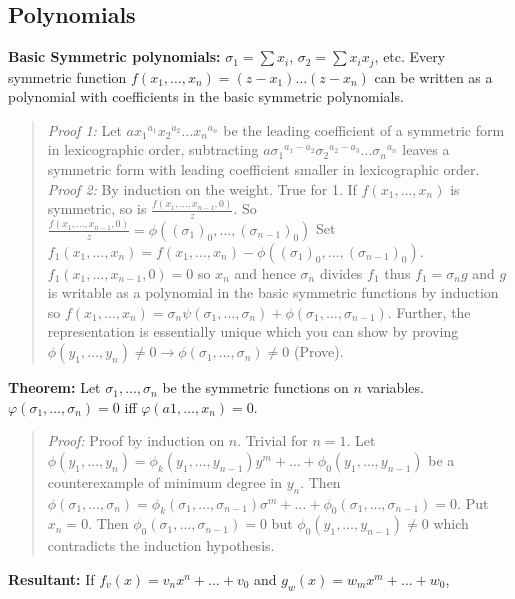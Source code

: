 \subsection{Polynomials}
{\bf Basic Symmetric polynomials:} $\sigma_1= \sum x_i$, $\sigma_2 = \sum x_i x_j$,
etc.  
Every symmetric function $f(x_1, \ldots , x_n)= (z-x_1) \ldots (z-x_n)$
can be written as a polynomial
with coefficients in the basic symmetric polynomials.  
\begin{quote}
\emph{Proof 1:}
Let $ a {x_1}^{a_1} {x_2}^{a_2} \ldots {x_n}^{a_n}$
be the leading coefficient of a symmetric form in lexicographic order,
subtracting
$a {\sigma_1}^{a_1 - a_2} {\sigma_2}^{a_2 - a_3} \ldots {\sigma_n}^{a_n}$
leaves a symmetric form with leading coefficient smaller in lexicographic
order.
\\
\emph{Proof 2:}  By induction on the weight.  True for 1.  If 
$f(x_1 , \ldots, x_n)$ is symmetric, so is
${\frac {f(x_1 , \ldots, x_{n-1},0)} z}$. 
So ${\frac {f(x_1 , \ldots, x_{n-1},0)} z}= 
\phi((\sigma_1)_0, \ldots , (\sigma_{n-1})_0)$
Set  
$f_1(x_1 , \ldots, x_n)=
f(x_1 , \ldots, x_n)-
\phi((\sigma_1)_0, \ldots , (\sigma_{n-1})_0)$.
$f_1(x_1 , \ldots, x_{n-1},0)=0$ so $x_n$ and hence $\sigma_n$ divides
$f_1$ thus $f_1 = \sigma_n g$ and $g$ is writable as a polynomial in the basic
symmetric functions by induction so
$f(x_1 , \ldots, x_n)= \sigma_n \psi(\sigma_1, \ldots , \sigma_n) 
+ \phi (\sigma_1 , \ldots , \sigma_{n-1})$.  Further, the representation is essentially
unique which you can show by proving 
$\phi(y_1 , \ldots , y_n) \ne 0 \rightarrow \phi(\sigma_1 , \ldots , \sigma_n) \ne 0 $
(Prove).
\end{quote}
{\bf Theorem:} Let $\sigma_1, \ldots , \sigma_n$ be the symmetric functions on $n$ variables.
$\varphi(\sigma_1 , \ldots , \sigma_n )=0 $ iff
$\varphi(a1 , \ldots , x_n )=0 $.
\begin{quote}
\emph{Proof:} 
Proof by induction on $n$.  Trivial for $n=1$.  
Let $\phi(y_1, \ldots , y_n)=
\phi_k(y_1, \ldots , y_{n-1}) y^m + \ldots + \phi_0(y_1 , \ldots , y_{n-1})$ be a
counterexample of minimum degree in $y_n$.
Then $\phi(\sigma_1, \ldots , \sigma_n)=
\phi_k(\sigma_1, \ldots , \sigma_{n-1}) \sigma^m + \ldots + \phi_0(\sigma_1 , \ldots , \sigma_{n-1})= 0$.
Put $x_n=0$.  Then  
$\phi_0(\sigma_1 , \ldots , \sigma_{n-1})= 0$ but
$\phi_0(y_1 , \ldots , y_{n-1}) \neq 0$ which contradicts the induction hypothesis.
\end{quote}
{\bf Resultant:}
If $f_{v}(x)= v_{n}x^{n}+ \ldots + v_{0}$ and
$g_{w}(x)= w_{m}x^{m}+ \ldots + w_{0}$,
